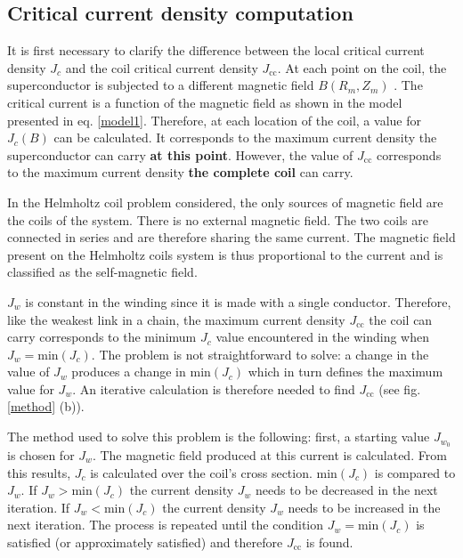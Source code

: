 \documentclass{ws-jmrr}
\begin{document}
\begin{multicols}{2}
\subsection{Critical current density computation}
\label{jccalc}
It is first necessary to clarify the difference between the local critical current density $J_c$ and the coil critical current density $J_{\textrm{cc}}$. 
 At each point on the coil, the superconductor is subjected to a different magnetic field $B(R_m,Z_m)$ \cite{linares2016design}. 
 The critical current is a function of the magnetic field as shown in the model presented in eq. \ref{model1}. 
 Therefore, at each location of the coil, a value for $J_c(B)$ can be calculated. 
 It corresponds to the maximum current density the superconductor can carry \textbf{at this point}. 
 However, the value of $J_{\textrm{cc}}$ corresponds to the maximum current density \textbf{the complete coil} can carry.\par
In the Helmholtz coil problem considered, the only sources of magnetic field are the coils of the system. 
 There is no external magnetic field. 
 The two coils are connected in series and are therefore sharing the same current. 
 The magnetic field present on the Helmholtz coils system is thus proportional to the current and is classified as the self-magnetic field.\par
$J_w$ is constant in the winding since it is made with a single conductor. 
Therefore,  like the weakest link in a chain, the maximum current density $J_{\textrm{cc}}$ the coil can carry corresponds to the minimum $J_c$ value encountered in the winding when $J_w=\textrm{min}(J_c)$. 
 The problem is not straightforward to solve: a change in the value of $J_w$ produces a change in $\textrm{min}(J_c)$ which in turn defines the maximum value for $J_w$. 
  An iterative calculation is therefore needed to find $J_{\textrm{cc}}$ (see fig. \ref{method} (b)).\par
The method used to solve this problem is the following: first, a starting value $J_{w_0}$ is chosen for $J_{w}$. 
The magnetic field produced at this current is calculated. 
 From this results, $J_c$ is calculated over the coil's cross section. $\textrm{min}(J_c)$ is compared to $J_w$. If $J_w>\textrm{min}(J_c)$ the current density $J_w$ needs to be decreased in the next iteration. If $J_w<\textrm{min}(J_c)$ the current density $J_w$ needs to be increased in the next iteration. The process is repeated until the condition $J_w=\textrm{min}(J_c)$ is satisfied (or approximately satisfied) and therefore $J_{\textrm{cc}}$ is found.\par

\end{multicols}
\end{document}
